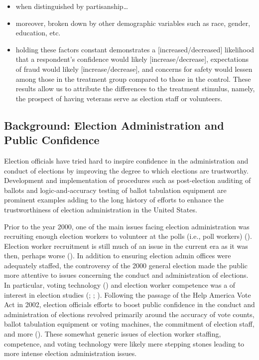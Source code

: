 \documentclass[
  11pt,
  a4paper,
]{scrartcl}
\providecommand{\tightlist}{%
  \setlength{\itemsep}{0pt}\setlength{\parskip}{0pt}}\usepackage{longtable,booktabs,array}
\begin{document}
\begin{itemize}
\tightlist
\item
  when distinguished by partisanship\ldots{}
\item
  moreover, broken down by other demographic variables such as race,
  gender, education, etc.
\item
  holding these factors constant demonstrates a
  {[}increased/decreased{]} likelihood that a respondent's confidence
  would likely {[}increase/decrease{]}, expectations of fraud would
  likely {[}increase/decrease{]}, and concerns for safety would lessen
  among those in the treatment group compared to those in the control.
  These results allow us to attribute the differences to the treatment
  stimulus, namely, the prospect of having veterans serve as election
  staff or volunteers.
\end{itemize}

\subsection{Background: Election Administration and Public
Confidence}\label{background-election-administration-and-public-confidence}

Election officials have tried hard to inspire confidence in the
administration and conduct of elections by improving the degree to which
elections are trustworthy. Development and implementation of procedures
such as post-election auditing of ballots and logic-and-accuracy testing
of ballot tabulation equipment are prominent examples adding to the long
history of efforts to enhance the trustworthiness of election
administration in the United States.

Prior to the year 2000, one of the main issues facing election
administration was recruiting enough election workers to volunteer at
the polls (i.e., poll workers) (). Election worker recruitment is still much of an issue in the
current era as it was then, perhaps worse
(). In
addition to ensuring election admin offices were adequately staffed, the
controversy of the 2000 general election made the public more attentive
to issues concerning the conduct and administration of elections. In
particular, voting technology () and election worker competence was a of
interest in election studies (; ;
).
Following the passage of the Help America Vote Act in 2002, election
officials efforts to boost public confidence in the conduct and
administration of elections revolved primarily around the accuracy of
vote counts, ballot tabulation equipment or voting machines, the
commitment of election staff, and more
(). These somewhat
generic issues of election worker staffing, competence, and voting
technology were likely mere stepping stones leading to more intense
election administration issues.
\end{document}

